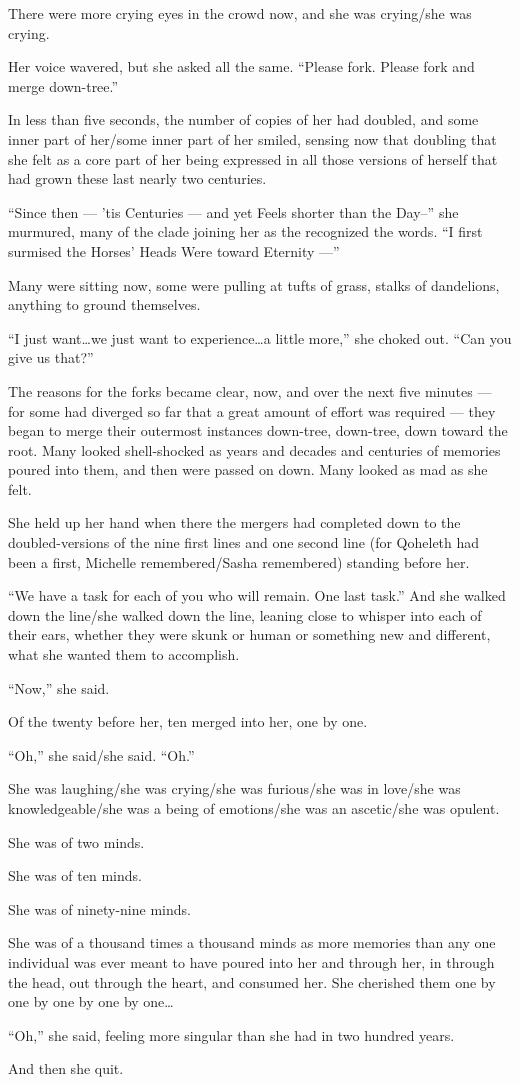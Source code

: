 There were more crying eyes in the crowd now, and she was crying/she was crying.

Her voice wavered, but she asked all the same. ``Please fork. Please fork and merge down-tree.''

In less than five seconds, the number of copies of her had doubled, and some inner part of her/some inner part of her smiled, sensing now that doubling that she felt as a core part of her being expressed in all those versions of herself that had grown these last nearly two centuries.

``Since then — 'tis Centuries — and yet Feels shorter than the Day--'' she murmured, many of the clade joining her as the recognized the words. ``I first surmised the Horses' Heads Were toward Eternity —''

Many were sitting now, some were pulling at tufts of grass, stalks of dandelions, anything to ground themselves.

``I just want\ldots we just want to experience\ldots a little more,'' she choked out. ``Can you give us that?''

The reasons for the forks became clear, now, and over the next five minutes — for some had diverged so far that a great amount of effort was required — they began to merge their outermost instances down-tree, down-tree, down toward the root. Many looked shell-shocked as years and decades and centuries of memories poured into them, and then were passed on down. Many looked as mad as she felt.

She held up her hand when there the mergers had completed down to the doubled-versions of the nine first lines and one second line (for Qoheleth had been a first, Michelle remembered/Sasha remembered) standing before her.

``We have a task for each of you who will remain. One last task.'' And she walked down the line/she walked down the line, leaning close to whisper into each of their ears, whether they were skunk or human or something new and different, what she wanted them to accomplish.

``Now,'' she said.

Of the twenty before her, ten merged into her, one by one.

``Oh,'' she said/she said. ``Oh.''

She was laughing/she was crying/she was furious/she was in love/she was knowledgeable/she was a being of emotions/she was an ascetic/she was opulent.

She was of two minds.

She was of ten minds.

She was of ninety-nine minds.

She was of a thousand times a thousand minds as more memories than any one individual was ever meant to have poured into her and through her, in through the head, out through the heart, and consumed her. She cherished them one by one by one by one by one\ldots{}

``Oh,'' she said, feeling more singular than she had in two hundred years.

And then she quit.
